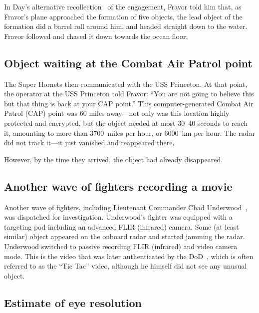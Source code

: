 In Day's alternative recollection~\cite{WestDayKevin2021Feb} of the engagement, Fravor told him that, as Fravor's plane
approached the formation of five objects, the lead object of the formation did  a barrel roll around him,
and headed straight down to the water. Fravor followed and chased it down towards the ocean floor.

\subsection{Object waiting at the Combat Air Patrol point}

The Super Hornets then communicated with the USS Princeton.
At that point, the operator at the USS Princeton told Fravor: ``You are not going to believe this but that thing is back at your CAP point.''
This computer-generated Combat Air Patrol (CAP) point was 60 miles away---not only was
this  location highly protected and encrypted, but the object needed at most 30--40 seconds to reach it, amounting to more than
3700~miles per hour, or 6000~km per hour.
The radar did not track it---it just vanished and reappeared there.

However, by the time they arrived, the object had already disappeared.

\subsection{Another wave of fighters recording a movie}

Another wave of fighters, including Lieutenant Commander Chad Underwood~\cite{Phelan2019Dec},
was dispatched for investigation. Underwood's fighter was equipped with a targeting pod including an advanced FLIR (infrared) camera.
Some (at least similar) object appeared on the onboard radar and started jamming the radar.
Underwood switched to passive recording FLIR (infrared) and video
camera mode.
This is the video that was later authenticated by the DoD~\cite{DOD2020}, which is often referred to as the ``Tic Tac'' video, although he himself did not see any unusual object.




\subsection{Estimate of eye resolution}

